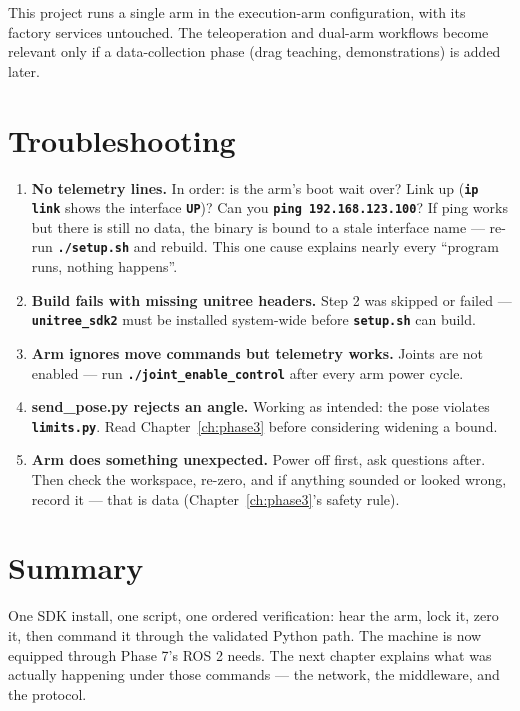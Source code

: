 \documentclass[11pt,twoside,openright]{book}
\newcommand{\code}[1]{\texttt{\bfseries #1}}
\begin{document}
This project runs a single arm in the execution-arm configuration, with
its factory services untouched. The teleoperation and dual-arm workflows
become relevant only if a data-collection phase (drag teaching,
demonstrations) is added later.

\section{Troubleshooting}

\begin{enumerate}
  \item \textbf{No telemetry lines.} In order: is the arm's boot wait
    over? Link up (\code{ip link} shows the interface \code{UP})? Can
    you \code{ping 192.168.123.100}? If ping works but there is still no
    data, the binary is bound to a stale interface name --- re-run
    \code{./setup.sh} and rebuild. This one cause explains nearly every
    ``program runs, nothing happens''.
  \item \textbf{Build fails with missing unitree headers.} Step 2 was
    skipped or failed --- \code{unitree\_sdk2} must be installed
    system-wide before \code{setup.sh} can build.
  \item \textbf{Arm ignores move commands but telemetry works.} Joints
    are not enabled --- run \code{./joint\_enable\_control} after every
    arm power cycle.
  \item \textbf{send\_pose.py rejects an angle.} Working as intended:
    the pose violates \code{limits.py}. Read
    Chapter~\ref{ch:phase3} before considering widening a bound.
  \item \textbf{Arm does something unexpected.} Power off first, ask
    questions after. Then check the workspace, re-zero, and if anything
    sounded or looked wrong, record it --- that is data
    (Chapter~\ref{ch:phase3}'s safety rule).
\end{enumerate}

\section*{Summary}

One SDK install, one script, one ordered verification: hear the arm, lock
it, zero it, then command it through the validated Python path. The
machine is now equipped through Phase 7's ROS 2 needs. The next chapter
explains what was actually happening under those commands --- the
network, the middleware, and the protocol.
\end{document}
